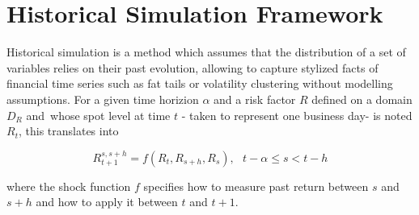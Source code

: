 \documentclass[10pt,a4paper]{report}
\begin{document}
\bigskip

\bigskip

\bigskip

\bigskip

\bigskip

\bigskip

\bigskip

\bigskip

\bigskip

\bigskip

\bigskip

\bigskip

\bigskip

\bigskip

\bigskip

\bigskip

\bigskip

\bigskip

\bigskip

\bigskip

\bigskip

\bigskip

\bigskip

\bigskip

\bigskip

\bigskip

\bigskip

\bigskip

\bigskip

\bigskip

\bigskip

\section{Historical Simulation Framework}

Historical simulation is a method which assumes that the distribution of a
set of variables relies on their past evolution, allowing to capture stylized
facts of financial time series such as fat tails or volatility clustering
without modelling assumptions. For a given time horizion $\alpha $ and a
risk factor $R$ defined on a domain $D_{R}$ and\ whose spot level at time $t$
- taken to represent one business day- is noted $R_{t}$, this translates
into

\begin{equation*}
R_{t+1}^{s,s+h}=f(R_{t},R_{s+h},R_{s}),\text{ \ \ }t-\alpha \leq s<t-h
\end{equation*}

where the shock function $f$ specifies how to measure past return between $s$
and $s+h$ and how to apply it between $t$ and $t+1$.
\end{document}
